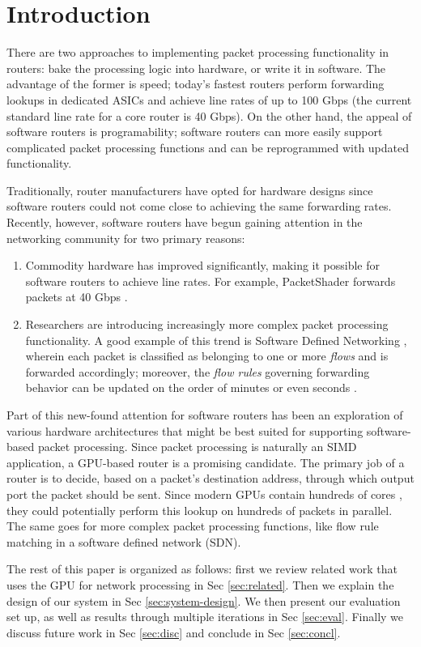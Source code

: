 \section{Introduction}

There are two approaches to implementing packet processing functionality in
routers: bake the processing logic into hardware, or write it in software. The
advantage of the former is speed; today's fastest routers perform forwarding
lookups in dedicated ASICs and achieve line rates of up to 100 Gbps (the
current standard line rate for a core router is 40 Gbps)\cite{Han}. On the
other hand, the appeal of software routers is programability; software routers
can more easily support complicated packet processing functions and can be
reprogrammed with updated functionality.

Traditionally, router manufacturers have opted for hardware designs since
software routers could not come close to achieving the same forwarding rates.
Recently, however, software routers have begun gaining attention in the
networking community for two primary reasons:
\begin{enumerate}
	\item Commodity hardware has improved significantly, making it possible for
	software routers to achieve line rates. For example, PacketShader forwards
	packets at 40 Gbps \cite{Han}.

	\item Researchers are introducing increasingly more complex packet
	processing functionality. A good example of this trend is Software Defined
	Networking \cite{OpenFlow}, wherein each packet is classified as belonging to
	one or more \emph{flows} and is forwarded accordingly; moreover, the
	\emph{flow rules} governing forwarding behavior can be updated on the order
	of minutes \cite{OpenFlow} or even seconds \cite{Jafarian}.
\end{enumerate}

Part of this new-found attention for software routers has been an exploration
of various hardware architectures that might be best suited for supporting
software-based packet processing. Since packet processing is naturally an SIMD
application, a GPU-based router is a promising candidate. The primary job of a
router is to decide, based on a packet's destination address, through which
output port the packet should be sent. Since modern GPUs contain hundreds of
cores \cite{Ryoo}, they could potentially perform this lookup on hundreds of
packets in parallel. The same goes for more complex packet processing
functions, like flow rule matching in a software defined network (SDN).


The rest of this paper is organized as follows: first we review related work that 
uses the GPU for network processing in Sec \ref{sec:related}. Then we explain the 
design of our system in Sec \ref{sec:system-design}. We then present our evaluation
set up, as well as results through multiple iterations in Sec \ref{sec:eval}. Finally we
discuss future work in Sec \ref{sec:disc} and conclude in Sec \ref{sec:concl}.
